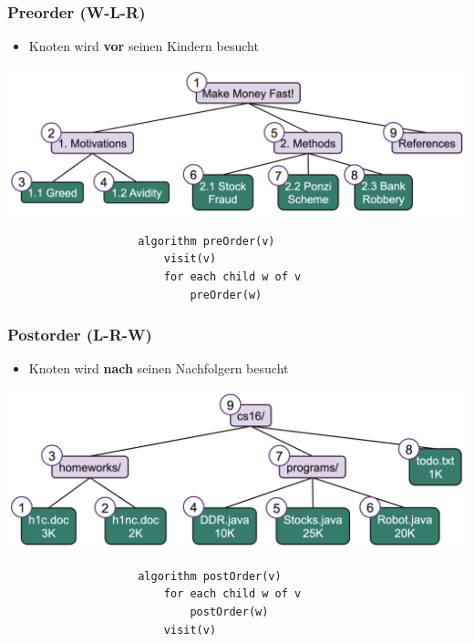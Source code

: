 \documentclass[a4paper, landscape, 8pt]{scrartcl}
\begin{document}
\begin{multicols*}{4}
                \subsubsection{Preorder (W-L-R)}
                    \begin{itemize}
                        \item Knoten wird {\bfseries vor} seinen Kindern besucht
                    \end{itemize}
                    \includegraphics[scale=0.14]{graphic/10_baum_traversierung_preorder}
                    \begin{lstlisting}
                    algorithm preOrder(v)
                        visit(v)
                        for each child w of v
                            preOrder(w)
                    \end{lstlisting}
        
                \subsubsection{Postorder (L-R-W)}
                    \begin{itemize}
                        \item Knoten wird {\bfseries nach} seinen Nachfolgern besucht
                    \end{itemize}
                    \includegraphics[scale=0.14]{graphic/11_baum_traversierung_postorder}
                    \begin{lstlisting}
                    algorithm postOrder(v)
                        for each child w of v
                            postOrder(w)
                        visit(v)
                    \end{lstlisting}
        

\end{multicols*}
\end{document}
